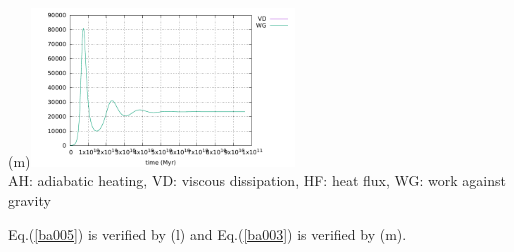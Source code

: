 \begin{center}
(m)\includegraphics[width=7cm]{python_codes/fieldstone_compressible2/BA_104/conservation2}\\
AH: adiabatic heating, VD: viscous dissipation, HF: heat flux, WG: work against gravity
\end{center}

Eq.(\ref{ba005}) is verified by (l) and Eq.(\ref{ba003}) is verified by (m).


